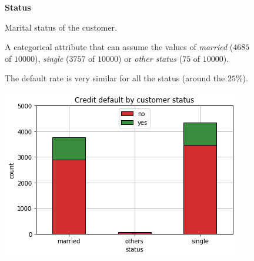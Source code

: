 \smallskip
\begin{figure}[h]
  \begin{minipage}[h]{.50\textwidth}
        {\Large \textbf{Status}}
        
        Marital status of the customer.
        
        A categorical attribute that can assume the values of 
        \textit{married} ($4685$ of $10000$),
        \textit{single} ($3757$ of $10000$) or
        \textit{other status} ($75$ of $10000$).
        
        The default rate is very similar for all the status (around the $25\%$).
  \end{minipage}
  \begin{minipage}[h]{.50\textwidth}
    \includegraphics[width=.95\textwidth]{img/ch2/status}
  \end{minipage}
\end{figure}


